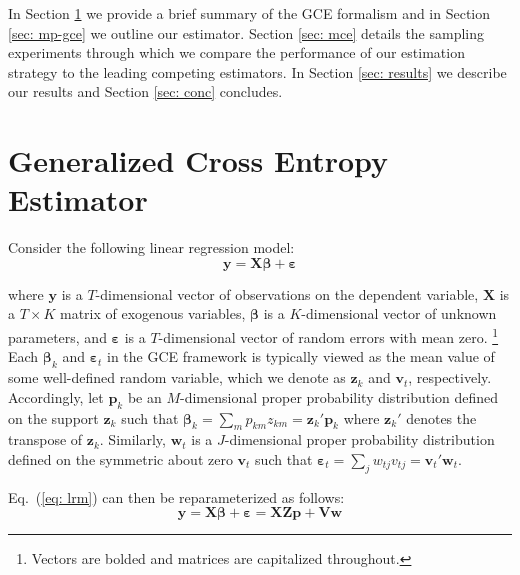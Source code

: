 \documentclass{elsarticle}
\begin{document}
In Section \ref{sec: gce} we provide a brief summary of the GCE formalism and in 
Section \ref{sec: mp-gce} we outline our estimator. 
Section \ref{sec: mce} details the sampling experiments through which we compare 
the performance of our estimation strategy to the leading competing estimators. 
In Section \ref{sec: results} we describe our results and Section \ref{sec: conc} 
concludes.


\section{Generalized Cross Entropy Estimator}
\label{sec: gce}

Consider the following linear regression model: 
\begin{equation}
\mathbf{y} = \mathbf{X\beta} + \mathbf{\varepsilon}
\label{eq: lrm}
\end{equation}

\noindent
where $\mathbf{y}$ is a $T$-dimensional vector of observations on the 
dependent variable, $\mathbf{X}$ is a $T\times K$ matrix of exogenous
variables, $\mathbf{\beta}$ is a $K$-dimensional vector of unknown 
parameters, and $\mathbf{\varepsilon}$ is a $T$-dimensional vector of 
random errors with mean zero.%
\footnote{Vectors are bolded and matrices are capitalized throughout.}
Each $\mathbf{\beta}_k$ and $\mathbf{\varepsilon}_t$ in the GCE 
framework is typically viewed as the mean value of some well-defined 
random variable, which we denote as $\mathbf{z}_k$ and $\mathbf{v}_t$, 
respectively.
Accordingly, let $\mathbf{p}_k$ be an $M$-dimensional proper 
probability distribution defined on the support $\mathbf{z}_k$ such that 
$\mathbf{\beta}_k = \sum_m p_{km}z_{km} = \mathbf{z}_k' 
\mathbf{p}_k$ where $\mathbf{z}_k'$ denotes the transpose of $\mathbf{z}_k$.
Similarly, $\mathbf{w}_t$ is a $J$-dimensional proper probability distribution defined on 
the symmetric about zero $\mathbf{v}_t$ such that $\mathbf{\varepsilon}_t = 
\sum_j w_{tj}v_{tj} = \mathbf{v}_t' \mathbf{w}_t$.

Eq.\ (\ref{eq: lrm}) can then be reparameterized as follows:
\begin{equation}
\mathbf{y} = \mathbf{X\beta} + \mathbf{\varepsilon} = 
\mathbf{X Z p} + \mathbf{V w}
\label{eq: reparm}
\end{equation}
\end{document}
